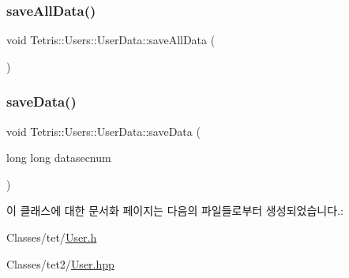 \mbox{\label{class_tetris_1_1_users_1_1_user_data_a0910f2f58efaa7d215804802144db8be}} 
\subsubsection{\texorpdfstring{save\+All\+Data()}{saveAllData()}}
{\footnotesize\ttfamily void Tetris\+::\+Users\+::\+User\+Data\+::save\+All\+Data (\begin{DoxyParamCaption}{ }\end{DoxyParamCaption})}

\mbox{\label{class_tetris_1_1_users_1_1_user_data_a18d94f063a675f9f1310745c9a5fd882}} 
\subsubsection{\texorpdfstring{save\+Data()}{saveData()}}
{\footnotesize\ttfamily void Tetris\+::\+Users\+::\+User\+Data\+::save\+Data (\begin{DoxyParamCaption}\item[{long long}]{datasecnum }\end{DoxyParamCaption})}



이 클래스에 대한 문서화 페이지는 다음의 파일들로부터 생성되었습니다.\+:\begin{DoxyCompactItemize}
\item 
Classes/tet/\hyperlink{_user_8h}{User.\+h}\item 
Classes/tet2/\hyperlink{_user_8hpp}{User.\+hpp}\end{DoxyCompactItemize}
